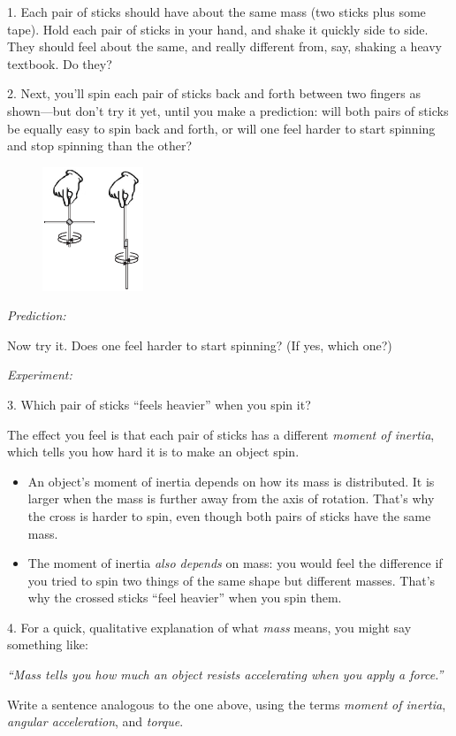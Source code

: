 1.  Each pair of sticks should have about the same mass (two sticks plus some tape).  Hold each pair of sticks in your hand, and shake it quickly side to side.  They should feel about the same, and really different from, say, shaking a heavy textbook.  Do they?
\answerspace{0.2in}


2.  Next, you'll spin each pair of sticks back and forth between two fingers as shown---but don't try it yet, until you make a prediction: will both pairs of sticks be equally easy to spin back and forth, or will one feel harder to start spinning and stop spinning than the other?

\begin{figure}
    \vspace{-0.45in}
    \includegraphics[width=0.27\textwidth]{moment_inertia_feel/stick_pics2.eps}
\end{figure}

\hspace{0.5in}\textit{Prediction:}
\answerspace{0.2in}

Now try it.  Does one feel harder to start spinning?  (If yes, which one?)

\hspace{0.5in}\textit{Experiment:}
\answerspace{0.2in}

3.  Which pair of sticks ``feels heavier'' when you spin it?
\answerspace{0.3in}

The effect you feel is that each pair of sticks has a different \textit{moment of inertia}, which tells you how hard it is to make an object spin.  
\begin{itemize}[nosep]
\item An object's moment of inertia depends on how its mass is distributed.  It is larger when the mass is further away from the axis of rotation.  That's why the cross is harder to spin, even though both pairs of sticks have the same mass.
\item The moment of inertia \textit{also depends} on mass: you would feel the difference if you tried to spin two things of the same shape but different masses.  That's why the crossed sticks ``feel heavier'' when you spin them.  
\end{itemize}
4. For a quick, qualitative explanation of what \textit{mass} means, you might say something like:

\hspace{0.5in}\textit{``Mass tells you how much an object resists accelerating when you apply a force.''}

Write a sentence analogous to the one above, using the terms \textit{moment of inertia}, \textit{angular acceleration}, and \textit{torque}.
\answerspace{0.3in}




